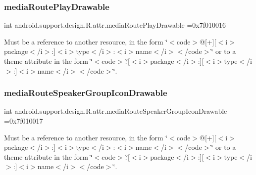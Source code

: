 \subsubsection{\texorpdfstring{media\+Route\+Play\+Drawable}{mediaRoutePlayDrawable}}
{\footnotesize\ttfamily int android.\+support.\+design.\+R.\+attr.\+media\+Route\+Play\+Drawable =0x7f010016\hspace{0.3cm}{\ttfamily [static]}}

Must be a reference to another resource, in the form \char`\"{}$<$code$>$@\mbox{[}+\mbox{]}\mbox{[}$<$i$>$package$<$/i$>$\+:\mbox{]}$<$i$>$type$<$/i$>$\+:$<$i$>$name$<$/i$>$$<$/code$>$\char`\"{} or to a theme attribute in the form \char`\"{}$<$code$>$?\mbox{[}$<$i$>$package$<$/i$>$\+:\mbox{]}\mbox{[}$<$i$>$type$<$/i$>$\+:\mbox{]}$<$i$>$name$<$/i$>$$<$/code$>$\char`\"{}. \mbox{\label{classandroid_1_1support_1_1design_1_1R_1_1attr_a7da2255a9d37f82edfc927653a263c6f}} 
\subsubsection{\texorpdfstring{media\+Route\+Speaker\+Group\+Icon\+Drawable}{mediaRouteSpeakerGroupIconDrawable}}
{\footnotesize\ttfamily int android.\+support.\+design.\+R.\+attr.\+media\+Route\+Speaker\+Group\+Icon\+Drawable =0x7f010017\hspace{0.3cm}{\ttfamily [static]}}

Must be a reference to another resource, in the form \char`\"{}$<$code$>$@\mbox{[}+\mbox{]}\mbox{[}$<$i$>$package$<$/i$>$\+:\mbox{]}$<$i$>$type$<$/i$>$\+:$<$i$>$name$<$/i$>$$<$/code$>$\char`\"{} or to a theme attribute in the form \char`\"{}$<$code$>$?\mbox{[}$<$i$>$package$<$/i$>$\+:\mbox{]}\mbox{[}$<$i$>$type$<$/i$>$\+:\mbox{]}$<$i$>$name$<$/i$>$$<$/code$>$\char`\"{}. \mbox{\label{classandroid_1_1support_1_1design_1_1R_1_1attr_a6007c27b2061cb105a1b2a5722a149bb}} 
